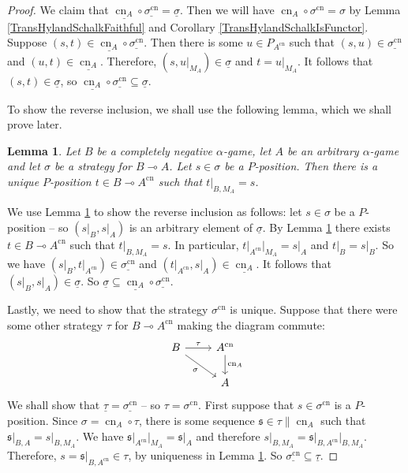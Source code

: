 \documentclass[11pt]{article} %
\theoremstyle{plain} %
\newtheorem{lemma}[theorem]{Lemma}
\theoremstyle{definition} %
\theoremstyle{note}
\theoremstyle{exercisestyle}
\renewcommand{\implies}{\multimap}
\newcommand{\comp}[2]{#1 \circ #2}
\newcommand{\s}{\mathfrak s}
\newcommand{\grel}[1]{\underline{#1}}
\DeclareMathOperator{\cn}{cn}
\begin{document}
\begin{proof}
  We claim that $\comp{\grel{\cn_A}}{\grel{\sigma^{\cn}}}=\grel\sigma$.  Then we will have $\comp{\cn_A}{\sigma^{\cn}}=\sigma$ by Lemma \ref{TransHylandSchalkFaithful} and Corollary \ref{TransHylandSchalkIsFunctor}.  Suppose $(s,t)\in\comp{\grel{\cn_A}}{\grel{\sigma^{\cn}}}$.  Then there is some $u\in P_{A^{\cn}}$ such that $(s,u)\in\grel{\sigma^{\cn}}$ and $(u,t)\in\grel{\cn_A}$.  Therefore, $(s,u\vert_{M_A})\in\grel\sigma$ and $t=u\vert_{M_A}$.  It follows that $(s,t)\in\grel{\sigma}$, so $\comp{\grel{\cn_A}}{\grel{\sigma^{\cn}}}\subseteq\grel\sigma$.  

  To show the reverse inclusion, we shall use the following lemma, which we shall prove later.  

  \begin{lemma}
    \label{CnLiftingLemma}
    Let $B$ be a completely negative $\alpha$-game, let $A$ be an arbitrary $\alpha$-game and let $\sigma$ be a strategy for $B\implies A$.  Let $s\in\sigma$ be a $P$-position.  Then there is a unique $P$-position $t\in B\implies A^{\cn}$ such that $t\vert_{B,M_A}=s$.
  \end{lemma}

  We use Lemma \ref{CnLiftingLemma} to show the reverse inclusion as follows: let $s\in\sigma$ be a $P$-position -- so $(s\vert_B,s\vert_A)$ is an arbitrary element of $\grel\sigma$.  By Lemma \ref{CnLiftingLemma} there exists $t\in B\implies A^{\cn}$ such that $t\vert_{B,M_A}=s$.  In particular, $t\vert_{A^{\cn}}\vert_{M_A}=s\vert_A$ and $t\vert_B=s\vert_B$.  So we have $(s\vert_B,t\vert_{A^{\cn}})\in\grel{\sigma^{\cn}}$ and $(t\vert_{A^{\cn}},s\vert_A)\in\grel{\cn_A}$.  It follows that $(s\vert_B,s\vert_A)\in\grel{\sigma}$.  So $\grel\sigma\subseteq\comp{\grel{\cn_A}}{\grel{\sigma^{\cn}}}$.  

  Lastly, we need to show that the strategy $\sigma^{\cn}$ is unique.  Suppose that there were some other strategy $\tau$ for $B\implies A^{\cn}$ making the diagram commute:
  \[
    \begin{tikzcd}
      B \arrow[r, "\tau"] \arrow[dr, "\sigma"']
        & A^{\cn} \arrow[d, "\cn_A"] \\
        & A
    \end{tikzcd}
    \]
  We shall show that $\grel\tau=\grel{\sigma^{\cn}}$ -- so $\tau=\sigma^{\cn}$.  First suppose that $s\in\sigma^{\cn}$ is a $P$-position.  Since $\sigma = \comp{\cn_A}{\tau}$, there is some sequence $\s\in\tau\|\cn_A$ such that $\s\vert_{B,A}=s\vert_{B,M_A}$.  We have $\s\vert_{A^{\cn}}\vert_{M_A}=\s\vert_A$ and therefore $s\vert_{B,M_A}=\s\vert_{B,A^{\cn}}\vert_{B,M_A}$.  Therefore, $s=\s\vert_{B,A^{\cn}}\in\tau$, by uniqueness in Lemma \ref{CnLiftingLemma}.  So $\grel{\sigma^{\cn}}\subseteq\grel{\tau}$.  


\end{proof}
\end{document}
